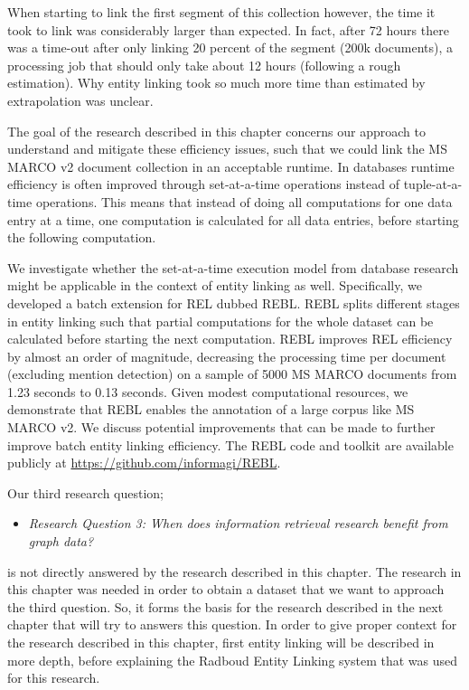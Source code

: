 When starting to link the first segment of this collection however, the time it took to link was considerably larger than expected. In fact, after 72 hours there was a time-out after only linking 20 percent of the segment (200k documents), a processing job that should only take about 12 hours (following a rough estimation). Why entity linking took so much more time than estimated by extrapolation was unclear. 

The goal of the research described in this chapter concerns our approach to understand and mitigate these efficiency issues, such that we could link the MS MARCO v2 document collection in an acceptable runtime. 
In databases runtime efficiency is often improved through set-at-a-time operations instead of tuple-at-a-time operations. This means that instead of doing all computations for one data entry at a time, one computation is calculated for all data entries, before starting the following computation. 

We investigate whether the set-at-a-time execution model from database research might be applicable in the context of entity linking as well. Specifically, we developed a batch extension for REL dubbed REBL. REBL splits different stages in entity linking such that partial computations for the whole dataset can be calculated before starting the next computation.
REBL improves REL efficiency by almost an order of magnitude, decreasing the processing time per document (excluding mention detection) on a sample of 5000 MS MARCO documents from 1.23 seconds to 0.13 seconds. Given modest computational resources, we demonstrate that REBL enables the annotation of a large corpus like MS MARCO v2. We discuss potential improvements that can be made to further improve batch entity linking efficiency. The REBL code and toolkit are available publicly at \url{https://github.com/informagi/REBL}.

Our third research question; 
\begin{itemize}
	\item \emph{Research Question 3: When does information retrieval research benefit from graph data?} 
\end{itemize} 
is not directly answered by the research described in this chapter. The research in this chapter was needed in order to obtain a dataset that we want to approach the third question. So, it forms the basis for the research described in the next chapter that will try to answers this question. In order to give proper context for the research described in this chapter, first entity linking will be described in more depth, before explaining the Radboud Entity Linking system that was used for this research. 

